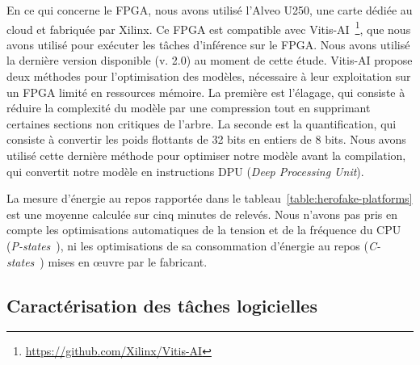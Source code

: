 En ce qui concerne le \gls{FPGA}, nous avons utilisé l'Alveo U250, une carte dédiée au cloud et fabriquée par Xilinx. Ce \gls{FPGA} est compatible avec Vitis-AI~\footnote{\href{https://github.com/Xilinx/Vitis-AI}{https://github.com/Xilinx/Vitis-AI}}, que nous avons utilisé pour exécuter les tâches d'inférence sur le \gls{FPGA}. Nous avons utilisé la dernière version disponible (v. 2.0) au moment de cette étude. Vitis-AI propose deux méthodes pour l'optimisation des modèles, nécessaire à leur exploitation sur un \gls{FPGA} limité en ressources mémoire. La première est l'élagage, qui consiste à réduire la complexité du modèle par une compression tout en supprimant certaines sections non critiques de l'arbre. La seconde est la quantification, qui consiste à convertir les poids flottants de 32 bits en entiers de 8 bits. Nous avons utilisé cette dernière méthode pour optimiser notre modèle avant la compilation, qui convertit notre modèle en instructions DPU (\textit{Deep Processing Unit}).

La mesure d'énergie au repos rapportée dans le tableau~\ref{table:herofake-platforms} est une moyenne calculée sur cinq minutes de relevés. Nous n'avons pas pris en compte les optimisations automatiques de la tension et de la fréquence du \gls{CPU} (\textit{P-states}~\cite{kwasnickDeterminationCPUUse2011}), ni les optimisations de sa consommation d'énergie au repos (\textit{C-states}~\cite{sueurSlowSleepThat}) mises en œuvre par le fabricant.

\subsection{Caractérisation des tâches logicielles}
\label{section:herofake-offline:workload}

